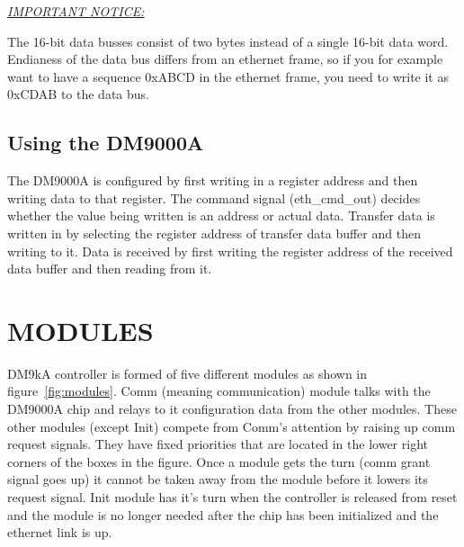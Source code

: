 \documentclass{article}
\begin{document}
\vspace{1pc}
\noindent
\parbox{\textwidth}{
  \underline{\emph{IMPORTANT NOTICE:}}

  The 16-bit data busses consist of two bytes instead of a single 16-bit
  data word. Endianess of the data bus differs from an ethernet frame,
  so if you for example want to have a sequence 0xABCD in the ethernet
  frame, you need to write it as 0xCDAB to the data bus.
}


\subsection{Using the DM9000A}

The DM9000A is configured by first writing in a register address and
then writing data to that register. The command signal (eth\_cmd\_out)
decides whether the value being written is an address or actual data.
Transfer data is written in by selecting the register address of
transfer data buffer and then writing to it. Data is received by first
writing the register address of the received data buffer and then
reading from it.


\FloatBarrier
\newpage

\section{MODULES}

DM9kA controller is formed of five different modules as shown in
figure~\ref{fig:modules}.  Comm (meaning communication) module talks
with the DM9000A chip and relays to it configuration data from the
other modules. These other modules (except Init) compete from Comm's
attention by raising up comm request signals. They have fixed
priorities that are located in the lower right corners of the boxes in
the figure. Once a module gets the turn (comm grant signal goes up) it
cannot be taken away from the module before it lowers its request
signal. Init module has it's turn when the controller is released from
reset and the module is no longer needed after the chip has been
initialized and the ethernet link is up.
\end{document}
